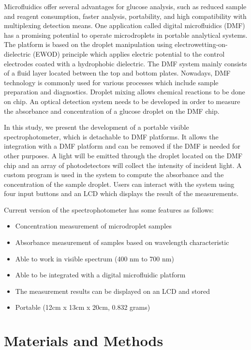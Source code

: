 \documentclass[conference]{IEEEtran}
\begin{document}
Microfluidics offer several advantages for glucose analysis, such as reduced sample and reagent consumption, faster analysis, portability, and high compatibility with multiplexing detection means\cite{b3,b4}.
One application called digital microfluidics (DMF) has a promising potential to operate microdroplets in portable analytical systems.
The platform is based on the droplet manipulation using electrowetting-on-dielectric (EWOD) principle which applies electric potential to the control electrodes coated with a hydrophobic dielectric\cite{b3}.
The DMF system mainly consists of a fluid layer located between the top and bottom plates. Nowadays, DMF technology is commonly used for various processes which include sample preparation and diagnostics\cite{b5}.
Droplet mixing allows chemical reactions to be done on chip. An optical detection system needs to be developed in order to measure the absorbance and concentration of a glucose droplet on the DMF chip. 

In this study, we present the development of a portable visible spectrophotometer, which is detachable to DMF platforms.
It allows the integration with a DMF platform and can be removed if the DMF is needed for other purposes.
A light will be emitted through the droplet located on the DMF chip and an array of photodetectors will collect the intensity of incident light.
A custom program is used in the system to compute the absorbance and the concentration of the sample droplet.
Users can interact with the system using four input buttons and an LCD which displays the result of the measurements. 

Current version of the spectrophotometer has some features as follows:
\begin{itemize}
    \item Concentration measurement of microdroplet samples 
    \item Absorbance measurement of samples based on wavelength characteristic 
    \item Able to work in visible spectrum (400 nm to 700 nm) 
    \item Able to be integrated with a digital microfluidic platform 
    \item The measurement results can be displayed on an LCD and stored 
    \item Portable (12cm x 13cm x 20cm, 0.832 grams)
\end{itemize}

\section{Materials and Methods}
\end{document}
